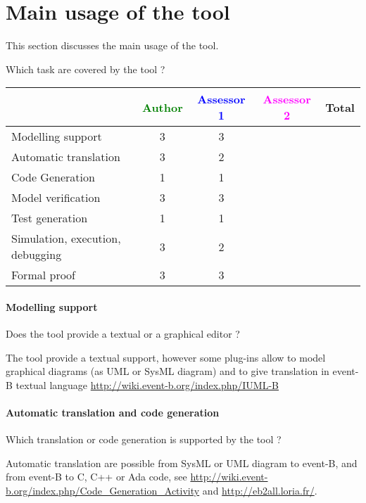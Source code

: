 \section{Main usage of the tool}
\label{main_usage}

This section discusses the main usage of the tool.

Which task are covered by the tool ?


\begin{tabular}{|l | c | c | c | c|}
\hline
& \textcolor{green}{Author} & \textcolor{blue}{Assessor 1} & \textcolor{magenta}{Assessor 2} & Total \\
\hline 
Modelling support & 3 & 3 & &  \\
\hline
Automatic translation  & 3 & 2 & & \\
\hline
Code Generation  & 1 & 1 & & \\
\hline
Model verification & 3 & 3 & & \\
\hline
Test generation & 1 & 1 & & \\
\hline
Simulation, execution, debugging & 3 & 2 & & \\
\hline
Formal proof & 3 & 3 & & \\
\hline
\end{tabular}

\paragraph{Modelling support}
Does the tool provide a  textual or a graphical editor ?


\begin{author_comment}
The tool provide a textual support, however some plug-ins allow to  model graphical diagrams (as UML or SysML diagram) and to give translation in event-B textual language \url{http://wiki.event-b.org/index.php/IUML-B}
\end{author_comment}



\paragraph{Automatic translation and code generation}
Which translation or code generation is supported by the tool ?

\begin{author_comment}
Automatic translation are possible from SysML  or UML diagram to event-B, and from event-B to C, C++  or Ada code, see \url{http://wiki.event-b.org/index.php/Code_Generation_Activity} and \url{http://eb2all.loria.fr/}.
\end{author_comment}

